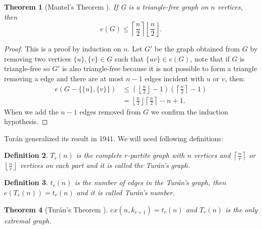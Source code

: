 \documentclass[12pt,twoside,a4paper]{book}
\numberwithin{equation}{section}
\newtheorem{theorem}             {Theorem}[section]
\newtheorem{definition}	[theorem] {Definition}
\theoremstyle{remark}
\begin{document}
\begin{theorem}[{Mantel's Theorem \cite{Ma07}}]
If G is a triangle-free graph on $n$ vertices, then 
$$e(G) \leq \left\lceil \frac{n}{2} \right\rceil \left\lfloor \frac{n}{2} \right\rfloor .$$
\end{theorem}
\begin{proof}
This is a proof by induction on $n$. Let $G'$ be the graph obtained from $G$ by removing two vertices $\{u\},\{v\} \in G$ such that $\{uv\}\in e(G)$, note that if $G$ is triangle-free so $G'$ is also triangle-free because it is not possible to form a triangle removing a edge and there are at most $n-1$ edges incident with $u$ or $v$, then:
\begin{align*}
e(G-\{\{u\},\{v\}\}) &\leq (\left\lfloor \frac{n}{2} \right\rfloor -1)(\left\lceil \frac{n}{2} \right\rceil -1) \\
&= \left\lfloor \frac{n}{2} \right\rfloor \left\lceil \frac{n}{2} \right\rceil - n +1.
\end{align*}
When we add the $n-1$ edges removed from $G$ we confirm the induction hypothesis. 
\end{proof}

Turán generalized its result in 1941. We will need following definitions: 
\begin{definition}$T_r(n)$ is the complete $r$-partite graph with $n$ vertices and $\left\lceil \frac{n}{r} \right\rceil$ or $\left\lfloor \frac{n}{r} \right\rfloor$ vertices on each part and it is called the Turán's graph.
\end{definition}

\begin{definition}
$t_r(n)$ is the number of edges in the Turán's graph, then $e(T_r(n)) = t_r(n)$ and it is called Turán's number.
\end{definition}

\begin{theorem}[{Turán's Theorem \cite{Tu41}}] \label{theorem:turan1941}%
 $ex(n, k_{r+1}) = t_r(n)$ and $T_r(n)$ is the only extremal graph.
\end{theorem}
\end{document}
